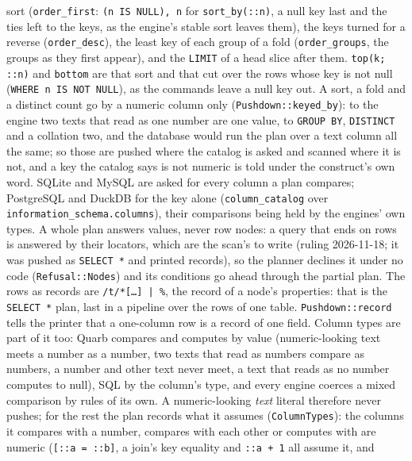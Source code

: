 \documentclass{report}
\begin{document}
\begin{enumerate}
    sort (\texttt{order\_first}: \texttt{(n IS NULL), n} for
    \texttt{sort\_by(::n)}, a null key last and the ties left to
    the keys, as the engine's stable sort leaves them), the keys
    turned for a reverse (\texttt{order\_desc}), the least key of
    each group of a fold (\texttt{order\_groups}, the groups as
    they first appear), and the \texttt{LIMIT} of a head slice
    after them. \texttt{top(k; ::n)} and \texttt{bottom} are that
    sort and that cut over the rows whose key is not null
    (\texttt{WHERE n IS NOT NULL}), as the commands leave a null
    key out. A sort, a fold and a distinct count go by a numeric
    column only (\texttt{Pushdown::keyed\_by}): to the engine two
    texts that read as one number are one value, to \texttt{GROUP
    BY}, \texttt{DISTINCT} and a collation two, and the database
    would run the plan over a text column all the same; so those
    are pushed where the catalog is asked and scanned where it is
    not, and a key the catalog says is not numeric is told under
    the construct's own word. SQLite and MySQL are asked for every
    column a plan compares; PostgreSQL and DuckDB for the key
    alone (\texttt{column\_catalog} over
    \texttt{information\_schema.columns}), their comparisons being
    held by the engines' own types. A whole plan answers
    values, never row nodes: a query that ends on rows is answered
    by their locators, which are the scan's to write (ruling
    2026-11-18; it was pushed as \texttt{SELECT *} and printed
    records), so the planner declines it under no code
    (\texttt{Refusal::Nodes}) and its conditions go ahead through
    the partial plan. The rows as records are
    \texttt{/t/*[\ldots] | \%}, the record of a node's properties:
    that is the \texttt{SELECT *} plan, last in a pipeline over
    the rows of one table. \texttt{Pushdown::record} tells the
    printer that a one-column row is a record of one field. Column
    types are part of it too: Quarb compares and computes by
    value (numeric-looking text meets a number as a number, two
    texts that read as numbers compare as numbers, a number and
    other text never meet, a text that reads as no number computes
    to null), SQL by the column's type, and every engine coerces a
    mixed comparison by rules of its own. A numeric-looking
    \emph{text} literal therefore never pushes; for the rest the
    plan records what it assumes (\texttt{ColumnTypes}): the columns
    it compares with a number, compares with each other or computes
    with are numeric (\texttt{[::a = ::b]}, a join's key equality
    and \texttt{::a + 1} all assume it, and

\end{enumerate}
\end{document}
